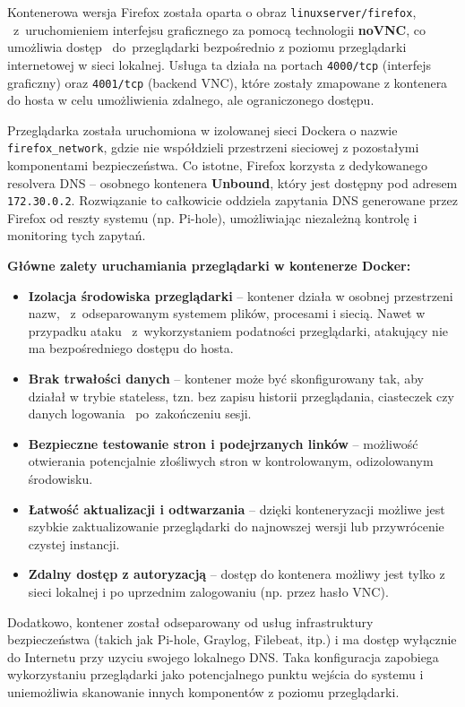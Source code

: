 \documentclass[
    left=2.5cm,         %
    right=2.5cm,        %
    top=2.5cm,          %
    bottom=3cm,         %
    bindingoffset=6mm,  %
    nohyphenation=true %
]{eiti/eiti-thesis} %
\begin{document}
Kontenerowa wersja Firefox została oparta o obraz \texttt{linuxserver/firefox}, ~z~uruchomieniem interfejsu graficznego za pomocą technologii \textbf{noVNC}, 
co umożliwia dostęp ~do~przeglądarki bezpośrednio z poziomu przeglądarki internetowej w sieci lokalnej. Usługa ta działa na portach \texttt{4000/tcp} (interfejs graficzny) oraz \texttt{4001/tcp} (backend VNC), które zostały zmapowane z kontenera do hosta w celu umożliwienia zdalnego, ale ograniczonego dostępu.

Przeglądarka została uruchomiona w izolowanej sieci Dockera o nazwie \texttt{firefox\_network}, gdzie nie współdzieli przestrzeni sieciowej z pozostałymi komponentami bezpieczeństwa. Co istotne, Firefox korzysta z dedykowanego resolvera DNS – osobnego kontenera \textbf{Unbound}\cite{config-unbound-firefox}, który jest dostępny 
pod adresem \texttt{172.30.0.2}. Rozwiązanie to całkowicie oddziela zapytania DNS generowane przez Firefox od reszty systemu (np. Pi-hole), umożliwiając niezależną kontrolę i monitoring tych zapytań.

\textbf{Główne zalety uruchamiania przeglądarki w kontenerze Docker:}
\begin{itemize}
    \item \textbf{Izolacja środowiska przeglądarki} – kontener działa w osobnej przestrzeni nazw, ~z~odseparowanym systemem plików, procesami i siecią. Nawet 
    w przypadku ataku ~z~wykorzystaniem podatności przeglądarki, atakujący nie ma bezpośredniego dostępu do hosta.
    \item \textbf{Brak trwałości danych} – kontener może być skonfigurowany tak, aby działał w trybie stateless, tzn. bez zapisu historii przeglądania, ciasteczek 
    czy danych logowania ~po~zakończeniu sesji.
    \item \textbf{Bezpieczne testowanie stron i podejrzanych linków} – możliwość otwierania potencjalnie złośliwych stron w kontrolowanym, odizolowanym środowisku.
    \item \textbf{Łatwość aktualizacji i odtwarzania} – dzięki konteneryzacji możliwe jest szybkie zaktualizowanie przeglądarki do najnowszej wersji lub przywrócenie czystej instancji.
    \item \textbf{Zdalny dostęp z autoryzacją} – dostęp do kontenera możliwy jest tylko z sieci lokalnej i po uprzednim zalogowaniu (np. przez hasło VNC).
\end{itemize}

Dodatkowo, kontener został odseparowany od usług infrastruktury bezpieczeństwa (takich jak Pi-hole, Graylog, Filebeat, itp.) i ma dostęp wyłącznie do Internetu przy uzyciu swojego lokalnego DNS. Taka konfiguracja zapobiega wykorzystaniu przeglądarki jako potencjalnego punktu wejścia do systemu i uniemożliwia skanowanie innych komponentów z poziomu przeglądarki.
\end{document}
